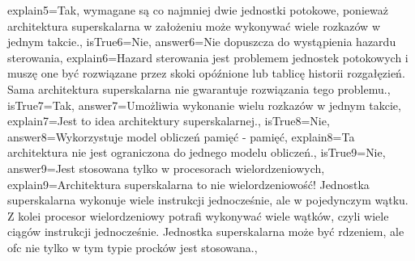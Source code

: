 \begin{enumerate}
\begin{minipage}{\textwidth}
{		explain5={Tak, wymagane są co najmniej dwie jednostki potokowe, ponieważ architektura superskalarna w założeniu może wykonywać wiele rozkazów w jednym takcie.},%
		isTrue6={Nie},%
		answer6={Nie dopuszcza do wystąpienia hazardu sterowania},%
		explain6={Hazard sterowania jest problemem jednostek potokowych i muszę one być rozwiązane przez skoki opóźnione lub tablicę historii rozgałęzień. Sama architektura superskalarna nie gwarantuje rozwiązania tego problemu.},%
		isTrue7={Tak},%
		answer7={Umożliwia wykonanie wielu rozkazów w jednym takcie},%
		explain7={Jest to idea architektury superskalarnej.},%
		isTrue8={Nie},%
		answer8={Wykorzystuje model obliczeń pamięć - pamięć},%
		explain8={Ta architektura nie jest ograniczona do jednego modelu obliczeń.},%
		isTrue9={Nie},%
		answer9={Jest stosowana tylko w procesorach wielordzeniowych},%
		explain9={Architektura superskalarna to nie wielordzeniowość! Jednostka superskalarna wykonuje wiele instrukcji jednocześnie, ale w pojedynczym wątku. Z kolei procesor wielordzeniowy potrafi wykonywać wiele wątków, czyli wiele ciągów instrukcji jednocześnie. Jednostka superskalarna może być rdzeniem, ale ofc nie tylko w tym typie procków jest stosowana.},%
	}
\end{minipage}
\begin{minipage}{\textwidth}
\end{minipage}
\begin{minipage}{\textwidth}
\end{minipage}
\end{enumerate}
